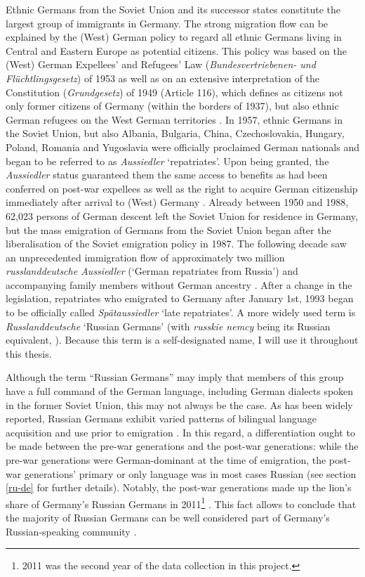 Ethnic Germans from the Soviet Union and its successor states constitute the largest group of immigrants in Germany. The strong migration flow can be explained by the (West) German policy to regard all ethnic Germans living in Central and Eastern Europe as potential citizens. This policy was based on the (West) German Expellees' and Refugees' Law (\textit{Bundesvertriebenen- und Flüchtlingsgesetz}) of 1953 as well as on an extensive interpretation of the Constitution (\textit{Grundgesetz}) of 1949 (Article 116), which defines as citizens not only former citizens of Germany (within the borders of 1937), but also ethnic German refugees on the West German territories \citep{muenz03}. In 1957, ethnic Germans in the Soviet Union, but also Albania, Bulgaria, China, Czechoslovakia, Hungary, Poland, Romania and Yugoslavia were officially proclaimed German nationals and began to be referred to as \textit{Aussiedler} `repatriates'. Upon being granted, the \textit{Aussiedler} status guaranteed them the same access to benefits as had been conferred on post-war expellees as well as the right to acquire German citizenship immediately after arrival to (West) Germany \citep{muenz03}. Already between 1950 and 1988, 62,023 persons of German descent left the Soviet Union for residence in Germany, but the mass emigration of Germans from the Soviet Union began after the liberalisation of the Soviet emigration policy in 1987. The following decade saw an unprecedented immigration flow of approximately two million \textit{russlanddeutsche Aussiedler} (`German repatriates from Russia') and accompanying family members without German ancestry \citep{lederer97}. After a change in the legislation, repatriates who emigrated to Germany after January 1st, 1993 began to be officially called \textit{Spätaussiedler} `late repatriates'. A more widely used term is \textit{Russlanddeutsche} `Russian Germans' (with \textit{russkie nemcy} being its Russian equivalent, \citealt[cf.][]{meng-protas}). Because this term is a self-designated name, I will use it throughout this thesis.

Although the term “Russian Germans” may imply that members of this group have a full command of the German language, including German dialects spoken in the former Soviet Union, this may not always be the case. As has been widely reported, Russian Germans exhibit varied patterns of bilingual language acquisition and use prior to emigration \citep{berend98,meng01,riehlTA,worbs-etal-13}. In this regard, a differentiation ought to be made between the pre-war generations and the post-war generations: while the pre-war generations were German-dominant at the time of emigration, the post-war generations' primary or only language was in most cases Russian (see section \ref{ru-de} for further details). Notably, the post-war generations made up the lion's share of Germany's Russian Germans in 2011\footnote{2011 was the second year of the data collection in this project.} \citep[41]{worbs-etal-13}. This fact allows to conclude that the majority of Russian Germans can be well considered part of Germany's Russian-speaking community \citep[cf.][]{meng01,roll03,brehmer07}.

